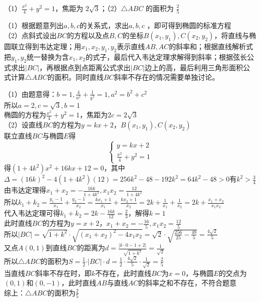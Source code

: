 \begin{corollary*}
（1）$\frac{x^2}{4}+y^2=1$，焦距为 $2\sqrt{3}$；（2）$\triangle ABC$ 的面积为 $\frac{2}{5}$
\end{corollary*}
\begin{property}
（1）根据题意列出$a, b, c$的关系式，求出$a, b, c$ ，即可得到椭圆的标准方程 \\
（2）点斜式设出$BC$的方程以及点$B, C$的坐标$B(x_1, y_1), C(x_2, y_2)$，将直线与椭圆联立得到韦达定理；用$x_1, x_2, y_1, y_2$表示直线$AB, AC$的斜率和；根据直线解析式把$y_1,y_2$统一替换为含$x_1,x_2$的式子，最后代入韦达定理求解得到斜率；根据弦长公式求出$\vert BC \vert$，再根据点到点距离公式求出$\vert BC \vert$边上的高，最后利用三角形面积公式计算$\triangle ABC$的面积。同时直线$BC$斜率不存在的情况需要单独讨论。

\end{property}

\begin{solution}
（1）由题意得：$b = 1, \frac{4}{a^2} + \frac{1}{b^2} = 1, a^2 = b^2 + c^2$\\
所以$a = 2, c = \sqrt{3}, b = 1$\\
椭圆的方程为$\frac{x^2}{4}+y^2=1$，焦距为$2c = 2\sqrt{3}$\\
（2）设直线$BC$的方程为$y = kx + 2$，$B(x_1, y_1), C(x_2, y_2)$\\
联立直线$BC$与椭圆$E$得
\[
\begin{cases}
y = kx + 2 \\
\frac{x^2}{4} + y^2 = 1
\end{cases}
\]
得$\left(1 + 4k^2\right)x^2 + 16kx + 12 = 0$，其中$\Delta = (16k)^2 - 4(1 + 4k^2)(12) = 256k^2 - 48 - 192k^2 = 64k^2 - 48 > 0$有$k^2 > \frac{3}{4}$\\
由韦达定理得$x_1 + x_2 = -\frac{16k}{1 + 4k^2}, x_1x_2 = \frac{12}{1 + 4k^2}$\\
所以$k_1 + k_2 = \frac{y_1 - 1}{x_1} + \frac{y_2 - 1}{x_2} = \frac{kx_1 + 1}{x_1} + \frac{kx_2 + 1}{x_2} = 2k + \frac{1}{x_1} + \frac{1}{x_2} = 2k + \frac{x_1 + x_2}{x_1x_2}$\\    
代入韦达定理可得$k_1 + k_2 = 2k - \frac{16k}{12} = \frac{2}{3}$，解得$k = 1$\\
此时直线$BC$的方程为$y = x + 2$，$x_1 + x_2 = -\frac{16}{5}, x_1x_2 = \frac{12}{5}$\\
所以$\vert BC \vert =  \sqrt{1 + k^2} \cdot \sqrt{(x_1 + x_2)^2 - 4x_1x_2} = \sqrt{2} \cdot \sqrt{\frac{256}{25} - \frac{48}{5}} = \frac{4\sqrt{2}}{5}$\\
又点$A(0,1)$到直线$BC$的距离为$d = \frac{|k \cdot 0 - 1 + 2|}{\sqrt{1 + k^2}} = \frac{1}{\sqrt{2}}$\\
所以$\triangle ABC$的面积为$S = \frac{1}{2} \cdot \vert BC \vert \cdot d = \frac{1}{2} \cdot \frac{4\sqrt{2}}{5} \cdot \frac{1}{\sqrt{2}} = \frac{2}{5}$\\
当直线$BC$斜率不存在时，即$k$不存在，此时直线$BC$为$x = 0$，与椭圆$E$的交点为$(0,1)$和$(0,-1)$，此时直线$AB$与直线$AC$的斜率之和不存在，不符合题意\\
综上：$\triangle ABC$的面积为$\frac{2}{5}$

\end{solution}



